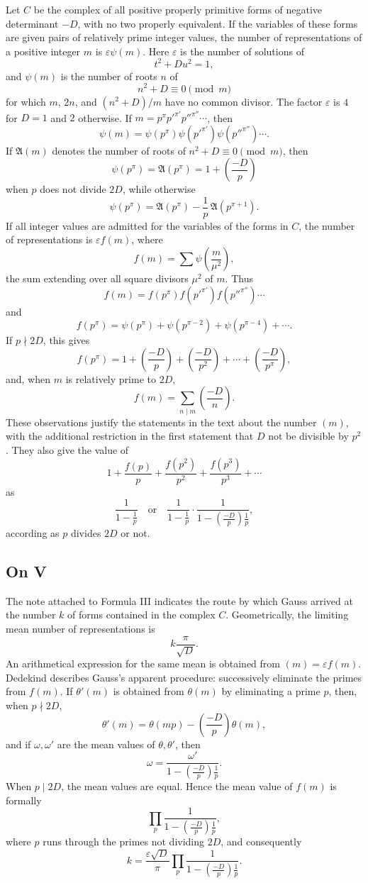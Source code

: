 \documentclass[12pt]{article}
\begin{document}
Let \(C\) be the complex of all positive properly primitive forms of negative determinant \(-D\), with no two properly equivalent. If the variables of these forms are given pairs of relatively prime integer values, the number of representations of a positive integer \(m\) is \(\varepsilon\psi(m)\). Here \(\varepsilon\) is the number of solutions of
\[
t^2+Du^2=1,
\]
and \(\psi(m)\) is the number of roots \(n\) of
\[
n^2+D\equiv0\pmod m
\]
for which \(m\), \(2n\), and \((n^2+D)/m\) have no common divisor. The factor \(\varepsilon\) is \(4\) for \(D=1\) and \(2\) otherwise. If \(m=p^\pi p'^{\pi'}p''^{\pi''}\cdots\), then
\[
\psi(m)=\psi(p^\pi)\psi(p'^{\pi'})\psi(p''^{\pi''})\cdots.
\]
If \(\mathfrak A(m)\) denotes the number of roots of \(n^2+D\equiv0\pmod m\), then
\[
\psi(p^\pi)=\mathfrak A(p^\pi)=1+\left(\frac{-D}{p}\right)
\]
when \(p\) does not divide \(2D\), while otherwise
\[
\psi(p^\pi)=\mathfrak A(p^\pi)-\frac1p\,\mathfrak A(p^{\pi+1}).
\]
If all integer values are admitted for the variables of the forms in \(C\), the number of representations is \(\varepsilon f(m)\), where
\[
f(m)=\sum\psi\!\left(\frac{m}{\mu^2}\right),
\]
the sum extending over all square divisors \(\mu^2\) of \(m\). Thus
\[
f(m)=f(p^\pi)f(p'^{\pi'})f(p''^{\pi''})\cdots
\]
and
\[
f(p^\pi)=\psi(p^\pi)+\psi(p^{\pi-2})+\psi(p^{\pi-4})+\cdots.
\]
If \(p\nmid2D\), this gives
\[
f(p^\pi)=1+\left(\frac{-D}{p}\right)+\left(\frac{-D}{p^2}\right)+\cdots+\left(\frac{-D}{p^\pi}\right),
\]
and, when \(m\) is relatively prime to \(2D\),
\[
f(m)=\sum_{n\mid m}\left(\frac{-D}{n}\right).
\]
These observations justify the statements in the text about the number \((m)\), with the additional restriction in the first statement that \(D\) not be divisible by \(p^2\). They also give the value of
\[
1+\frac{f(p)}p+\frac{f(p^2)}{p^2}+\frac{f(p^3)}{p^3}+\cdots
\]
as
\[
\frac{1}{1-\frac1p}
\quad\text{or}\quad
\frac{1}{1-\frac1p}\cdot\frac{1}{1-\left(\frac{-D}{p}\right)\frac1p},
\]
according as \(p\) divides \(2D\) or not.

\subsection*{On V}

The note attached to Formula III indicates the route by which Gauss arrived at the number \(k\) of forms contained in the complex \(C\). Geometrically, the limiting mean number of representations is
\[
k\frac{\pi}{\sqrt D}.
\]
An arithmetical expression for the same mean is obtained from \((m)=\varepsilon f(m)\). Dedekind describes Gauss's apparent procedure: successively eliminate the primes from \(f(m)\). If \(\theta'(m)\) is obtained from \(\theta(m)\) by eliminating a prime \(p\), then, when \(p\nmid2D\),
\[
\theta'(m)=\theta(mp)-\left(\frac{-D}{p}\right)\theta(m),
\]
and if \(\omega,\omega'\) are the mean values of \(\theta,\theta'\), then
\[
\omega=\frac{\omega'}{1-\left(\frac{-D}{p}\right)\frac1p}.
\]
When \(p\mid2D\), the mean values are equal. Hence the mean value of \(f(m)\) is formally
\[
\prod_p\frac{1}{1-\left(\frac{-D}{p}\right)\frac1p},
\]
where \(p\) runs through the primes not dividing \(2D\), and consequently
\[
k=\frac{\varepsilon\sqrt D}{\pi}\prod_p\frac{1}{1-\left(\frac{-D}{p}\right)\frac1p}.
\]
\end{document}
